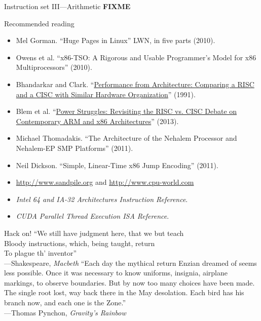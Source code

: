 \documentclass[mathserif,xcolor={dvipsnames,table}]{beamer}
\begin{document}
\begin{frame}{Instruction set III---Arithmetic}
\huge\textbf{FIXME}
\end{frame}

\begin{frame}{Recommended reading}
\footnotesize{
\begin{itemize}
\item Mel Gorman. ``Huge Pages in Linux'' LWN, in five parts (2010).
\item Owens et al. ``x86-TSO: A Rigorous and Usable Programmer's Model for x86 Multiprocessors'' (2010).
\item Bhandarkar and Clark. ``\href{http://dl.acm.org/citation.cfm?id=107003}{Performance from Architecture: Comparing a
RISC and a CISC with Similar Hardware Organization}'' (1991).
\vfill
\item Blem et al. ``\href{http://research.cs.wisc.edu/vertical/papers/2013/hpca13-isa-power-struggles.pdf}{Power Struggles: Revisiting the RISC vs. CISC Debate on
Contemporary ARM and x86 Architectures}'' (2013).
\vfill
\item Michael Thomadakis. ``The Architecture of the Nehalem Processor and
Nehalem-EP SMP Platforms'' (2011).
\vfill
\item Neil Dickson. ``Simple, Linear-Time x86 Jump Encoding'' (2011).
\vfill
\item \href{http://www.sandpile.org}{http://www.sandpile.org} and 
\href{http://www.cpu-world.com}{http://www.cpu-world.com}
\vfill
\item \textit{Intel 64 and IA-32 Architectures Instruction Reference}.
\vfill
\item \textit{CUDA Parallel Thread Execution ISA Reference}.
\end{itemize}
}
\end{frame}

\begin{frame}{Hack on!}
``We still have judgment here, that we but teach\\
Bloody instructions, which, being taught, return\\
To plague th' inventor''\\
\hfill---Shakespeare, \textit{Macbeth}
\vfill
``Each day the mythical return Enzian dreamed of seems less possible. Once it
was necessary to know uniforms, insignia, airplane markings, to observe
boundaries. But by now too many choices have been made. The single root lost,
way back there in the May desolation. Each bird has his branch now, and each
one is the Zone.''\\
\hfill---Thomas Pynchon, \textit{Gravity's Rainbow}
\end{frame}
\end{document}
